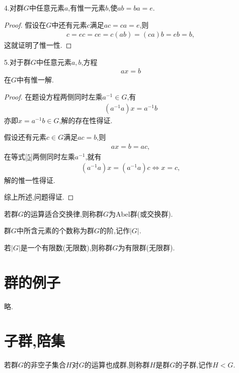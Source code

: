4.对群$G$中任意元素$a$,有惟一元素$b$,使$ab=ba=e$.\begin{proof}
    假设在$G$中还有元素$c$满足$ac=ca=e$,则\begin{align*}
        c=ec=ce=c(ab)=(ca)b=eb=b,
    \end{align*}这就证明了惟一性.
\end{proof}

5.对于群$G$中任意元素$a,b$,方程\begin{align*}
    ax=b
\end{align*}在$G$中有惟一解.\begin{proof}
    在题设方程两侧同时左乘$a^{-1}\in G$,有\begin{align*}
        (a^{-1}a)x=a^{-1}b
    \end{align*}亦即$x=a^{-1}b\in G$,解的存在性得证.

    假设还有元素$c\in G$满足$ac=b$,则\begin{align}
        ax=b=ac,\label{5}
    \end{align}在等式\eqref{5}两侧同时左乘$a^{-1}$,就有\begin{align*}
        (a^{-1}a)x=(a^{-1}a)c\iff x=c,
    \end{align*}解的惟一性得证.

    综上所述,问题得证.
\end{proof}

\begin{definition}
    若群$G$的运算适合交换律,则称群$G$为Abel群(或交换群).
\end{definition}

\begin{definition}[阶]
    群$G$中所含元素的个数称为群$G$的阶,记作$|G|$.
\end{definition}

\begin{definition}[有限群与无限群]\label{yxqywxq}
    若$|G|$是一个有限数(无限数),则称群$G$为有限群(无限群).
\end{definition}
\section{群的例子}
略.
\section{子群,陪集}
\begin{definition}[子群]
    若群$G$的非空子集合$H$对$G$的运算也成群,则称群$H$是群$G$的子群,记作$H<G$.
\end{definition}

